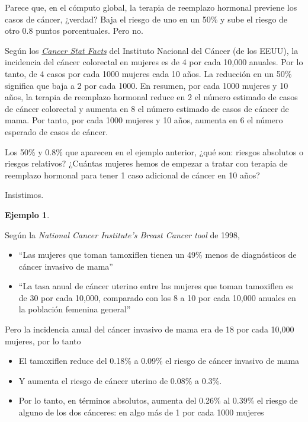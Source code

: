\documentclass[
]{book}
\providecommand{\tightlist}{%
  \setlength{\itemsep}{0pt}\setlength{\parskip}{0pt}}
\theoremstyle{definition}
\theoremstyle{definition}
\newtheorem{example}{Ejemplo}[chapter]
\theoremstyle{definition}
\theoremstyle{definition}
\theoremstyle{remark}
\begin{document}
Parece que, en el cómputo global, la terapia de reemplazo hormonal previene los casos de cáncer, ¿verdad? Baja el riesgo de uno en un 50\% y sube el riesgo de otro 0.8 puntos porcentuales. Pero no.

Según los \href{https://seer.cancer.gov/statfacts/}{\emph{Cancer Stat Facts}} del Instituto Nacional del Cáncer (de los EEUU), la incidencia del cáncer colorectal en mujeres es de 4 por cada 10,000 anuales. Por lo tanto, de 4 casos por cada 1000 mujeres cada 10 años. La reducción en un 50\% significa que baja a 2 por cada 1000. En resumen, por cada 1000 mujeres y 10 años, la terapia de reemplazo hormonal reduce en 2 el número estimado de casos de cáncer colorectal y aumenta en 8 el número estimado de casos de cáncer de mama. Por tanto, por cada 1000 mujeres y 10 años, aumenta en 6 el número esperado de casos de cáncer.

\begin{rmdexercici}
Los 50\% y 0.8\% que aparecen en el ejemplo anterior, ¿qué son: riesgos absolutos o riesgos relativos? ¿Cuántas mujeres hemos de empezar a tratar con terapia de reemplazo hormonal para tener 1 caso adicional de cáncer en 10 años?
\end{rmdexercici}

Insistimos.

\begin{example}
\protect\hypertarget{exm:unnamed-chunk-188}{}\label{exm:unnamed-chunk-188}

Según la \emph{National Cancer Institute's Breast Cancer tool} de 1998,

\begin{itemize}
\item
  ``Las mujeres que toman tamoxiflen tienen un 49\% menos de diagnósticos de cáncer invasivo de mama''
\item
  ``La tasa anual de cáncer uterino entre las mujeres que toman tamoxiflen es de 30 por cada 10,000, comparado con los 8 a 10 por cada 10,000 anuales en la población femenina general''
\end{itemize}

\end{example}

Pero la incidencia anual del cáncer invasivo de mama era de 18 por cada 10,000 mujeres, por lo tanto

\begin{itemize}
\tightlist
\item
  El tamoxiflen reduce del 0.18\% a 0.09\% el riesgo de cáncer invasivo de mama
\item
  Y aumenta el riesgo de cáncer uterino de 0.08\% a 0.3\%.
\item
  Por lo tanto, en términos absolutos, aumenta del 0.26\% al 0.39\% el riesgo de alguno de los dos cánceres: en algo más de 1 por cada 1000 mujeres
\end{itemize}
\end{document}
